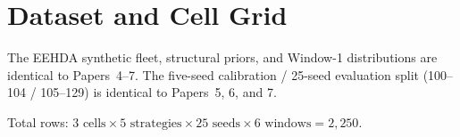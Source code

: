 \section{Dataset and Cell Grid}

The EEHDA synthetic fleet, structural priors, and Window-1 distributions
are identical to Papers~4--7. The five-seed calibration / 25-seed
evaluation split (100--104 / 105--129) is identical to Papers~5, 6, and 7.



Total rows: $3 \text{ cells} \times 5 \text{ strategies} \times 25 \text{ seeds}
\times 6 \text{ windows} = 2{,}250$.
